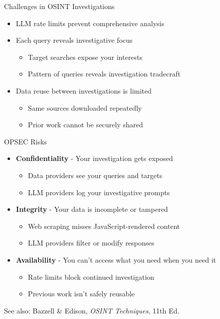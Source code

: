\documentclass[pdf,aspectratio=169]{beamer}
\begin{document}
\begin{frame}{Challenges in OSINT Investigations}
  \begin{itemize}
  \item LLM rate limits prevent comprehensive analysis
  \item Each query reveals investigative focus
    \begin{itemize}
    \item Target searches expose your interests
    \item Pattern of queries reveals investigation tradecraft
    \end{itemize}
  \item Data reuse between investigations is limited
    \begin{itemize}
    \item Same sources downloaded repeatedly
    \item Prior work cannot be securely shared
    \end{itemize}
  \end{itemize}
\end{frame}

\begin{frame}{OPSEC Risks}
  \begin{itemize}
  \item \textbf{Confidentiality} - Your investigation gets exposed
    \begin{itemize}
    \item Data providers see your queries and targets
    \item LLM providers log your investigative prompts
    \end{itemize}
  \item \textbf{Integrity} - Your data is incomplete or tampered
    \begin{itemize}
    \item Web scraping misses JavaScript-rendered content
    \item LLM providers filter or modify responses
    \end{itemize}
  \item \textbf{Availability} - You can't access what you need when you need it
    \begin{itemize}
    \item Rate limits block continued investigation
    \item Previous work isn't safely reusable
    \end{itemize}
  \end{itemize}

  \footnotesize{See also: Bazzell \& Edison, \textit{OSINT
      Techniques}, 11th Ed.}
\end{frame}
\end{document}
